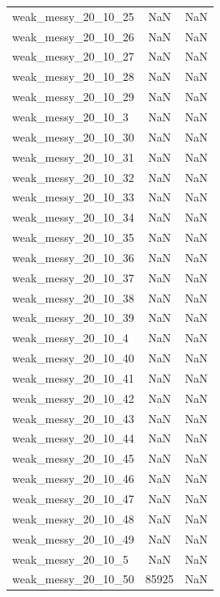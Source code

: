 \begin{longtable}{lcc}
weak\_messy\_20\_10\_25    &      NaN &    NaN \\
weak\_messy\_20\_10\_26    &      NaN &    NaN \\
weak\_messy\_20\_10\_27    &      NaN &    NaN \\
weak\_messy\_20\_10\_28    &      NaN &    NaN \\
weak\_messy\_20\_10\_29    &      NaN &    NaN \\
weak\_messy\_20\_10\_3     &      NaN &    NaN \\
weak\_messy\_20\_10\_30    &      NaN &    NaN \\
weak\_messy\_20\_10\_31    &      NaN &    NaN \\
weak\_messy\_20\_10\_32    &      NaN &    NaN \\
weak\_messy\_20\_10\_33    &      NaN &    NaN \\
weak\_messy\_20\_10\_34    &      NaN &    NaN \\
weak\_messy\_20\_10\_35    &      NaN &    NaN \\
weak\_messy\_20\_10\_36    &      NaN &    NaN \\
weak\_messy\_20\_10\_37    &      NaN &    NaN \\
weak\_messy\_20\_10\_38    &      NaN &    NaN \\
weak\_messy\_20\_10\_39    &      NaN &    NaN \\
weak\_messy\_20\_10\_4     &      NaN &    NaN \\
weak\_messy\_20\_10\_40    &      NaN &    NaN \\
weak\_messy\_20\_10\_41    &      NaN &    NaN \\
weak\_messy\_20\_10\_42    &      NaN &    NaN \\
weak\_messy\_20\_10\_43    &      NaN &    NaN \\
weak\_messy\_20\_10\_44    &      NaN &    NaN \\
weak\_messy\_20\_10\_45    &      NaN &    NaN \\
weak\_messy\_20\_10\_46    &      NaN &    NaN \\
weak\_messy\_20\_10\_47    &      NaN &    NaN \\
weak\_messy\_20\_10\_48    &      NaN &    NaN \\
weak\_messy\_20\_10\_49    &      NaN &    NaN \\
weak\_messy\_20\_10\_5     &      NaN &    NaN \\
weak\_messy\_20\_10\_50    &    85925 &    NaN \\

\end{longtable}
